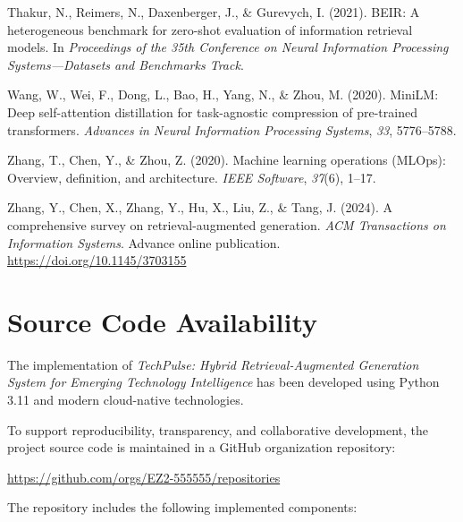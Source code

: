 \documentclass[12pt,a4paper]{report}
\begin{document}
{Thakur, N., Reimers, N., Daxenberger, J., \& Gurevych, I. (2021). BEIR: A heterogeneous benchmark for zero-shot evaluation of information retrieval models. In \textit{Proceedings of the 35th Conference on Neural Information Processing Systems---Datasets and Benchmarks Track}.

Wang, W., Wei, F., Dong, L., Bao, H., Yang, N., \& Zhou, M. (2020). MiniLM: Deep self-attention distillation for task-agnostic compression of pre-trained transformers. \textit{Advances in Neural Information Processing Systems}, \textit{33}, 5776--5788.

Zhang, T., Chen, Y., \& Zhou, Z. (2020). Machine learning operations (MLOps): Overview, definition, and architecture. \textit{IEEE Software}, \textit{37}(6), 1--17.

Zhang, Y., Chen, X., Zhang, Y., Hu, X., Liu, Z., \& Tang, J. (2024). A comprehensive survey on retrieval-augmented generation. \textit{ACM Transactions on Information Systems}. Advance online publication. \url{https://doi.org/10.1145/3703155}


}



\appendix

\chapter{Source Code Availability}

The implementation of \textit{TechPulse: Hybrid Retrieval-Augmented Generation System for Emerging Technology Intelligence} has been developed using Python 3.11 and modern cloud-native technologies.

To support reproducibility, transparency, and collaborative development, the project source code is maintained in a GitHub organization repository:

\begin{center}
\url{https://github.com/orgs/EZ2-555555/repositories}
\end{center}

The repository includes the following implemented components:
\end{document}
